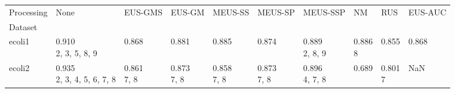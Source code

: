 \begin{tabular}{llllllllll}
\toprule
Processing &                                                     None &                                EUS-GMS &                                       EUS-GM &                                      MEUS-SS &                                   MEUS-SP &                                     MEUS-SSP &                                  NM &                                 RUS &                                EUS-AUC \\
Dataset                &                                                          &                                        &                                              &                                              &                                           &                                              &                                     &                                     &                                        \\
\midrule
ecoli1                 &           \makecell{0.910 \\ \scriptsize{2, 3, 5, 8, 9}} &      \makecell{0.868 \\ \scriptsize{}} &            \makecell{0.881 \\ \scriptsize{}} &            \makecell{0.885 \\ \scriptsize{}} &         \makecell{0.874 \\ \scriptsize{}} &     \makecell{0.889 \\ \scriptsize{2, 8, 9}} &  \makecell{0.886 \\ \scriptsize{8}} &   \makecell{0.855 \\ \scriptsize{}} &      \makecell{0.868 \\ \scriptsize{}} \\
ecoli2                 &     \makecell{0.935 \\ \scriptsize{2, 3, 4, 5, 6, 7, 8}} &  \makecell{0.861 \\ \scriptsize{7, 8}} &        \makecell{0.873 \\ \scriptsize{7, 8}} &        \makecell{0.858 \\ \scriptsize{7, 8}} &     \makecell{0.873 \\ \scriptsize{7, 8}} &     \makecell{0.896 \\ \scriptsize{4, 7, 8}} &   \makecell{0.689 \\ \scriptsize{}} &  \makecell{0.801 \\ \scriptsize{7}} &                                    NaN \\

\end{tabular}
